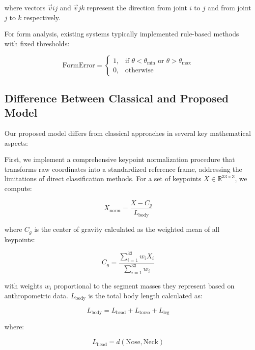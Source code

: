 \documentclass[11pt]{article}
\begin{document}
where vectors $\vec{v}{ij}$ and $\vec{v}{jk}$ represent the direction from joint $i$ to $j$ and from joint $j$ to $k$ respectively.

For form analysis, existing systems typically implemented rule-based methods with fixed thresholds:

\begin{equation}
\text{FormError} = 
\begin{cases}
1, & \text{if } \theta < \theta_{\text{min}} \text{ or } \theta > \theta_{\text{max}} \\
0, & \text{otherwise}
\end{cases}
\end{equation}

\subsection{Difference Between Classical and Proposed Model}
Our proposed model differs from classical approaches in several key mathematical aspects:

First, we implement a comprehensive keypoint normalization procedure that transforms raw coordinates into a standardized reference frame, addressing the limitations of direct classification methods. For a set of keypoints $X \in \mathbb{R}^{33 \times 3}$, we compute:

\begin{equation}
X_{\text{norm}} = \frac{X - C_g}{L_{\text{body}}}
\end{equation}

where $C_g$ is the center of gravity calculated as the weighted mean of all keypoints:

\begin{equation}
C_g = \frac{\sum_{i=1}^{33} w_i X_i}{\sum_{i=1}^{33} w_i}
\end{equation}

with weights $w_i$ proportional to the segment masses they represent based on anthropometric data. $L_{\text{body}}$ is the total body length calculated as:

\begin{equation}
L_{\text{body}} = L_{\text{head}} + L_{\text{torso}} + L_{\text{leg}}
\end{equation}

where:

\begin{equation}
L_{\text{head}} = d(\text{Nose}, \text{Neck})
\end{equation}
\end{document}
